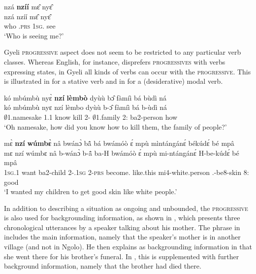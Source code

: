 \ea\label{Progquest}
  \glll nzá {\bfseries nzíí} mɛ̂ nyɛ̂ \\
    nzá nzíí mɛ̂ nyɛ̂ \\
         who {\PROG}.\textsc{prs} 1\textsc{sg}.{\OBJ} see\\
    \trans `Who is seeing me?'
\z

Gyeli \textsc{progressive} aspect does not seem to be restricted to any particular verb classes. Whereas English, for instance, disprefers \textsc{progressives} with verbs expressing states, in Gyeli all kinds of verbs can occur with the \textsc{progressive}. This is illustrated in  for a stative verb and in  for a (desiderative) modal verb.

\ea\label{Progstative}
  \glll kó mbúmbù nyɛ̀ {\bfseries nzí} {\bfseries lèmbò} dyùù bɔ̂ fàmíì bá bùdì ná \\
       kó mbúmbù nyɛ nzí lèmbo dyùù b-ɔ̂ fàmíì bá b-ùdì ná \\
       {\EXCL} $\emptyset$1.namesake 1.{\PST}1 {\PROG} know kill 2-{\OBJ} $\emptyset$1.family 2:{\ATT} ba2-person how\\
    \trans `Oh namesake, how did you know how to kill them, the family of people?'
\z

\ea\label{Progmodal}
  \glll mɛ̀ {\bfseries nzí} {\bfseries wúmbɛ̀} nâ bwánɔ̀ bã̂ bá bwámóò ɛ́ mpù mìntángánɛ́ békúdɛ́ bé mpâ\\
        mɛ nzí wúmbɛ nâ b-wánɔ̀ b-ã̂ ba-H bwámóò ɛ́ mpù mi-ntángánɛ́ H-be-kúdɛ́ bé mpâ \\
        1\textsc{sg}.{\PST}1 {\PROG} want {\COMP} ba2-child 2-{\POSS}.1\textsc{sg} 2-\textsc{prs} become.{\SBJV} {\LOC} like.this mi4-white.person {\OBJ}.{\LINK}-be8-skin 8:{\ATT} good\\
    \trans `I wanted my children to get good skin like white people.'
\z

In addition to describing a situation as ongoing and unbounded, the \textsc{progressive} is also used for backgrounding information, as shown in , which presents three chronological utterances by a speaker talking about his mother. The phrase in  includes the main information, namely that the speaker's mother is in another village (and not in Ngolo). He then explains as backgrounding information in  that she went there for his brother's funeral. In , this is supplemented with further background information, namely that the brother had died there.

